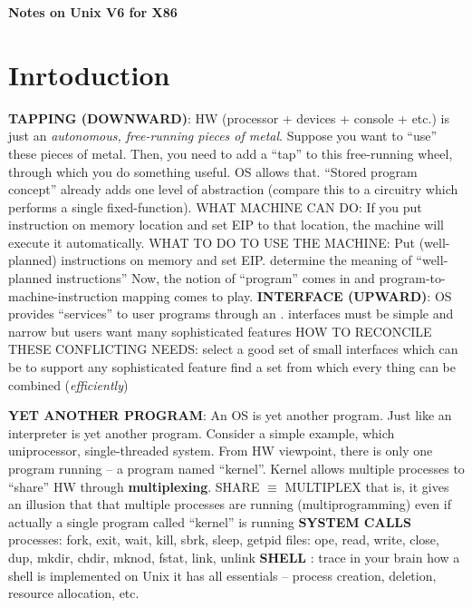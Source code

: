 \documentclass{note}
\begin{document}
\small

\begin{center}
{\large\bf \textcolor{blue2}{Notes on Unix V6 for X86}}
\end{center}

\vspace*{1cm}

\tableofcontents
\pagebreak

\section{Inrtoduction}
\bit
\w \textcolor{red2}{\bf TAPPING (DOWNWARD)}: HW (processor + devices + console + etc.) is just an \textcolor{red2}{\em
  autonomous, free-running pieces of metal\/}.  
  \bit
  \w Suppose you want to ``use'' these pieces of metal. Then, you need to add a
``tap'' to this free-running wheel, through which you do something useful.
  OS allows that.
  \w ``Stored program concept'' already adds one level of abstraction (compare
  this to a circuitry which performs a single fixed-function).
  \w WHAT MACHINE CAN DO:
     \bit
     \w If you put instruction on memory location and set EIP to that
     location,
       the machine will execute it automatically.
     \eit
  \w WHAT TO DO TO USE THE MACHINE:
     \bit
     \w Put (well-planned) instructions on memory and set EIP.
     \w determine the meaning of ``well-planned instructions''
     \w Now, the notion of ``program'' comes in and
     program-to-machine-instruction mapping comes to play.
     \eit
  \eit
\w \textcolor{red2}{\bf INTERFACE (UPWARD)}: OS provides ``services'' to user programs through an .
   \bit
   \w interfaces must be \textcolor{red2}{simple and narrow}
   \w but users want many sophisticated features
   \w HOW TO RECONCILE THESE CONFLICTING NEEDS:
     \bit
     \w select a good set of small interfaces which can be  to
     support any sophisticated feature
     \w find a  set from which every thing can be combined
         ({\em efficiently\/})
     \eit
   \eit

\w \textcolor{red2}{\bf{}YET ANOTHER PROGRAM}: An OS is yet another
program. Just like an interpreter is yet another program. 
   \bit
   \w Consider a simple example, which uniprocessor, single-threaded system.
   \w \textcolor{red2}{From HW viewpoint, there is only one program running --
     a program named ``kernel''.}
   \w Kernel allows multiple processes to ``share'' HW through
   \textcolor{red2}{\bf multiplexing}. 
     \bit
     \w SHARE $\equiv$ MULTIPLEX
     \eit
   \w that is, it gives an illusion that that multiple processes are running
   (multiprogramming) even if actually a single program called ``kernel'' is
   running 
   \eit
\w \textcolor{red2}{\bf{}SYSTEM CALLS}
  \bit
  \w processes: fork, exit, wait, kill, sbrk, sleep, getpid
  \w files: ope, read, write, close, dup, mkdir, chdir, mknod, fstat, link,
  unlink
  \eit
\w \textcolor{red2}{\bf SHELL}
  \bit
  \w {}: trace in your brain how a shell is implemented
  on Unix 
  \w it has all essentials -- process creation, deletion, resource allocation,
  etc. 
  \eit
\eit
\end{document}
